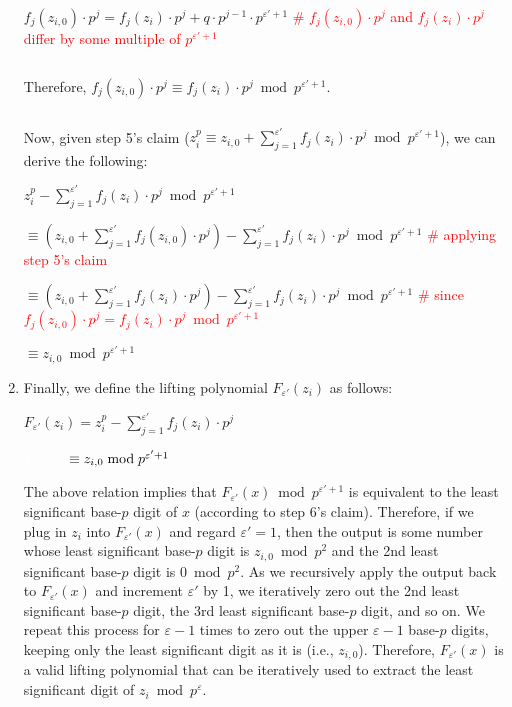\begin{enumerate}
\begin{myproof}
$f_j(z_{i,0})\cdot p^j = f_j(z_i)\cdot p^j + q\cdot p^{j-1} \cdot p^{\varepsilon'+1}$ \textcolor{red}{ \# $f_j(z_{i,0})\cdot p^j$ and $f_j(z_i)\cdot p^j$ differ by some multiple of $p^{\varepsilon' + 1}$}

$ $

Therefore, $f_j(z_{i,0})\cdot p^j \equiv f_j(z_i)\cdot p^j \bmod p^{\varepsilon' + 1}$.

$ $

Now, given step 5's claim ($z_i^p \equiv z_{i,0} + \sum\limits_{j=1}^{\varepsilon'}f_j(z_{i})\cdot p^j \bmod p^{\varepsilon'+1}$), we can derive the following:

$z_i^p - \sum\limits_{j=1}^{\varepsilon'}f_j(z_{i})\cdot p^j \bmod p^{\varepsilon' + 1}$

$\equiv (z_{i,0} + \sum\limits_{j=1}^{\varepsilon'}f_j(z_{i,0})\cdot p^j) - \sum\limits_{j=1}^{\varepsilon'}f_j(z_{i})\cdot p^j \bmod p^{\varepsilon' + 1}$ \textcolor{red}{ \# applying step 5's claim}

$\equiv (z_{i,0} + \sum\limits_{j=1}^{\varepsilon'}f_j(z_i)\cdot p^j) - \sum\limits_{j=1}^{\varepsilon'}f_j(z_i)\cdot p^j \bmod p^{\varepsilon' + 1}$ \textcolor{red}{ \# since $f_j(z_{i,0})\cdot p^j = f_j(z_i)\cdot p^j \bmod p^{\varepsilon' + 1}$}

$\equiv z_{i,0} \bmod p^{\varepsilon' + 1}$

\end{myproof}

\item Finally, we define the lifting polynomial $F_{\varepsilon'}(z_i)$ as follows:

$F_{\varepsilon'}(z_i) = z_i^p - \sum\limits_{j=1}^{\varepsilon'}f_j(z_i)\cdot p^j$

$\textcolor{white}{F_{\varepsilon'}(z_i) } \equiv z_{i,0} \bmod p^{\varepsilon' + 1}$


The above relation implies that $F_{\varepsilon'}(x) \bmod p^{\varepsilon'+1}$ is equivalent to the least significant base-$p$ digit of $x$ (according to step 6's claim). Therefore, if we plug in $z_i$ into $F_{\varepsilon'}(x)$ and regard $\varepsilon' = 1$, then the output is some number whose least significant base-$p$ digit is $z_{i,0} \bmod p^2$ and the 2nd least significant base-$p$ digit is $0 \bmod p^2$. As we recursively apply the output back to $F_{\varepsilon'}(x)$ and increment $\varepsilon'$ by 1, we iteratively zero out the 2nd least significant base-$p$ digit, the 3rd least significant base-$p$ digit, and so on. We repeat this process for $\varepsilon-1$ times to zero out the upper $\varepsilon-1$ base-$p$ digits, keeping only the least significant digit as it is (i.e., $z_{i,0}$). Therefore, $F_{\varepsilon'}(x)$ is a valid lifting polynomial that can be iteratively used to extract the least significant digit of $z_i \bmod p^\varepsilon$. 


\end{enumerate}

